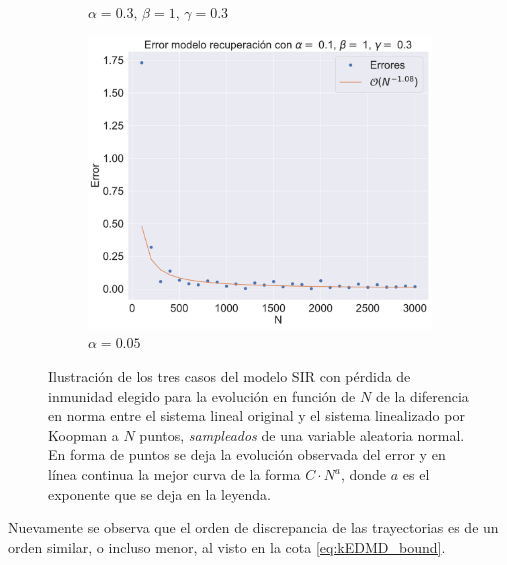 \begin{figure}[h]
\begin{subfigure}[b]{0.32\textwidth}
        \caption{$\alpha=0.3$, $\beta=1$, $\gamma=0.3$}
    \end{subfigure}
    \hfill
    \begin{subfigure}[b]{0.32\textwidth}
        \centering
        \includegraphics[width=\textwidth]{img/content/chapter3/SIR_rec3Errors.pdf}
        \caption{$\alpha=0.05$}
    \end{subfigure}
    \caption{Ilustración de los tres casos del modelo SIR con pérdida de inmunidad elegido para la evolución en función de $N$ de la diferencia en norma entre el sistema lineal original y el sistema linealizado por Koopman a $N$ puntos,  \textit{sampleados} de una variable aleatoria normal. En forma de puntos se deja la evolución observada del error y en línea continua la mejor curva de la forma $C \cdot N^{a}$, donde $a$ es el exponente que se deja en la leyenda.}
    \label{fig:ErrorSIR_rec}
\end{figure}
Nuevamente se observa que el orden de discrepancia de las trayectorias es de un orden similar, o incluso menor, al visto en la cota \ref{eq:kEDMD_bound}.